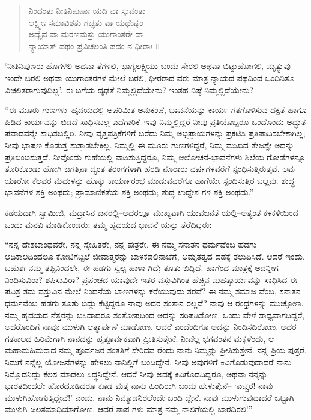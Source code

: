 \begin{verse}
ನಿಂದಂತು ನೀತಿನಿಪುಣಾಃ ಯದಿ ವಾ ಸ್ತುವಂತು\\ಲಕ್ಷ್ಮೀಃ ಸಮಾವಿಶತು ಗಚ್ಛತು ವಾ ಯಥೇಷ್ಟಂ\\ಅದ್ಯೈವ ವಾ ಮರಣಮಸ್ತು ಯುಗಾಂತರೇ ವಾ\\ನ್ಯಾಯಾತ್ ಪಥಂ ಪ್ರವಿಚಲಂತಿ ಪದಂ ನ ಧೀರಾಃ ॥
\end{verse}

‘ನೀತಿನಿಪುಣರು ಹೊಗಳಲಿ ಅಥವಾ ತೆಗಳಲಿ, ಭಾಗ್ಯಲಕ್ಷ್ಮಿಯು ಬಂದು ಸೇರಲಿ ಅಥವಾ ಬಿಟ್ಟುಹೋಗಲಿ, ಮೃತ್ಯುವು ಇಂದೇ ಬರಲಿ ಅಥವಾ ಯುಗಾಂತರಗಳ ಮೇಲೆ ಬರಲಿ, ಧೀರರಾದ ವರು ಮಾತ್ರ ನ್ಯಾಯದ ಪಥದಿಂದ ಒಂದಿನಿತೂ ವಿಚಲಿತರಾಗುವುದಿಲ್ಲ’. ಈ ಬಗೆಯ ದೃಢತೆ ನಿಮ್ಮಲ್ಲಿದೆಯೇನು? ಇಂತಹ ನಿಷ್ಠೆ ನಿಮ್ಮಲ್ಲಿದೆಯೇನು?

“ಈ ಮೂರು ಗುಣಗಳು–ಹೃದಯದಲ್ಲಿ ಅಪರಿಮಿತ ಅನುಕಂಪೆ, ಭಾವನೆಯನ್ನು ಕಾರ್ಯ ಗತಗೊಳಿಸುವ ದಕ್ಷತೆ ಹಾಗೂ ಹಿಡಿದ ಕಾರ್ಯವನ್ನು ಬಿಡದೆ ಸಾಧಿಸಬಲ್ಲ ಎದೆಗಾರಿಕೆ–ಇವು ನಿಮ್ಮಲ್ಲಿದ್ದರೆ ನೀವು ಪ್ರತಿಯೊಬ್ಬರೂ ಒಂದೊಂದು ಅದ್ಭುತ ಪವಾಡವನ್ನೇ ಸಾಧಿಸಬಲ್ಲಿರಿ. ನೀವು ವೃತ್ತಪತ್ರಿಕೆಗಳಿಗೆ ಬರೆದು ನಿಮ್ಮ ಅಭಿಪ್ರಾಯಗಳನ್ನು ಪ್ರಕಟಿಸಿ ಪ್ರತಿಪಾದಿಸಬೇಕಾಗಿಲ್ಲ; ನೀವು ಭಾಷಣ ಕೊಡುತ್ತ ಸುತ್ತಾಡಬೇಕಿಲ್ಲ. ನಿಮ್ಮಲ್ಲಿ ಈ ಮೂರು ಗುಣಗಳಿದ್ದರೆ, ನಿಮ್ಮ ಮುಖದ ತೇಜಸ್ಸೇ ಅದನ್ನು ಪ್ರತಿಬಿಂಬಿಸುತ್ತದೆ. ನೀವೊಂದು ಗುಹೆಯಲ್ಲಿ ವಾಸಿಸುತ್ತಿದ್ದರೂ, ನಿಮ್ಮ ಆಲೋಚನೆ-ಭಾವನೆಗಳು ಶಿಲೆಯ ಗೋಡೆಗಳನ್ನೂ ತೂರಿಕೊಂಡು ಹೋಗಿ ಜಗತ್ತಿನಾ ದ್ಯಂತ ತರಂಗಗಳಾಗಿ ಹರಡಿ ನೂರಾರು ವರ್ಷಗಳವರೆಗೆ ಸ್ಪಂಧಿಸುತ್ತಿರುತ್ತವೆ. ಅವು ಯಾರೋ ಕೆಲವರ ಮೆದುಳನ್ನು ಹೊಕ್ಕು ಕಾರ್ಯಾರಂಭ ಮಾಡುವವರೆಗೂ ಹಾಗೆಯೇ ಸ್ಪಂದಿಸುತ್ತಿರ ಬಲ್ಲವು. ಶುದ್ಧ ಭಾವನೆಗಳ ಶಕ್ತಿ ಅಂಥದು; ಪ್ರಾಮಾಣಿಕತೆಯ ಶಕ್ತಿ ಅಂಥದು; ಶುದ್ಧ ಉದ್ದೇಶ ಗಳ ಶಕ್ತಿ ಅಂಥದು.”

ಕಡೆಯದಾಗಿ ಸ್ವಾಮೀಜಿ, ಮದ್ರಾಸಿನ ಜನರಲ್ಲಿ–ಅದರಲ್ಲೂ ಮುಖ್ಯವಾಗಿ ಯುವಜನತೆ ಯಲ್ಲಿ–ಅತ್ಯಂತ ಕಳಕಳಿಯಿಂದ ಒಂದು ಮನವಿ ಮಾಡಿಕೊಂಡರು; ತಮ್ಮ ಹೃದಯದ ಭಾವನೆ ಯನ್ನು ತೆರೆದಿಟ್ಟರು:

“ನನ್ನ ದೇಶಬಾಂಧವರೇ, ನನ್ನ ಸ್ನೇಹಿತರೇ, ನನ್ನ ಪುತ್ರರೇ, ಈ ನಮ್ಮ ಸನಾತನ ಧರ್ಮವೆಂಬ ಹಡಗು ಆದಿಕಾಲದಿಂದಲೂ ಕೋಟಿಗಟ್ಟಲೆ ಜೀವಾತ್ಮರನ್ನು ಬಾಳಕಡಲಿನಾಚೆಗೆ, ಅಮೃತತ್ವದ ದಡಕ್ಕೆ ತಲುಪಿಸಿದೆ. ಆದರೆ ಇಂದು, ಬಹುಶಃ ನಮ್ಮ ತಪ್ಪಿನಿಂದಲೇ, ಈ ಹಡಗು ಸ್ವಲ್ಪ ಹಾಳಾ ಗಿದೆ; ತೂತು ಬಿದ್ದಿದೆ. ಹಾಗೆಂದ ಮಾತ್ರಕ್ಕೆ ಅದನ್ನೀಗ ನಿಂದಿಸುವಿರಾ? ಶಪಿಸುವಿರಾ? ಪ್ರಪಂಚದ ಯಾವುದೇ ಇತರ ವಸ್ತುವಿಗಿಂತ ಹೆಚ್ಚಿನ ಮಹತ್ಕಾರ್ಯವನ್ನು ಸಾಧಿಸಿದ ಈ ಪವಿತ್ರ ತಮ ವಸ್ತುವಿನ ಮೇಲೆ ನಿಂದನೆಯ ಬಾಣಗಳನ್ನು ಕರೆಯುವುದು ತರವೆ? ಈ ನಮ್ಮ ಸಮಾಜ ವೆಂಬ, ಸನಾತನ ಧರ್ಮವೆಂಬ ಹಡಗು ತೂತು ಬಿದ್ದು ಕೆಟ್ಟಿದ್ದರೂ ನಾವು ಅದರ ಸಂತಾನ ರಲ್ಲವೆ? ನಾವು ಆ ರಂಧ್ರಗಳನ್ನು ಮುಚ್ಚೋಣ. ನಮ್ಮ ಹೃದಯದ ನೆತ್ತರನ್ನು ಬಸಿದಾದರೂ ಸಂತೋಷದಿಂದ ಅದನ್ನು ಸರಿಪಡಿಸೋಣ. ಒಂದು ವೇಳೆ ಸಾಧ್ಯವಾಗದಿದ್ದರೆ, ಅದರೊಂದಿಗೆ ನಾವೂ ಮುಳುಗಿ ಆತ್ಮಾರ್ಪಣೆ ಮಾಡೋಣ. ಆದರೆ ಎಂದೆಂದಿಗೂ ಅದನ್ನು ನಿಂದಿಸದಿರೋಣ. ಅದರ ಗತಕಾಲದ ಹಿರಿಮೆಗಾಗಿ ನಾನದನ್ನು ಹೃತ್ಪೂರ್ವಕವಾಗಿ ಪ್ರೀತಿಸುತ್ತೇನೆ. ನೀವೆಲ್ಲ ಭಗವಂತನ ಮಕ್ಕಳೆಂದು, ಆ ಮಹಾಮಹಿಮರಾದ ನಮ್ಮ ಪೂರ್ವಜರ ಸಂತತಿಗೆ ಸೇರಿದವ ರೆಂದು ನಾನು ನಿಮ್ಮನ್ನು ಪ್ರೀತಿಸುತ್ತೇನೆ. ನನ್ನ ಪ್ರಿಯ ಪುತ್ರರೆ, ನಿಮಗೆ ನನ್ನೆಲ್ಲ ಯೋಜನೆಗಳನ್ನು ಹೇಳಲು ನಾನಿಲ್ಲಿಗೆ ಬಂದಿದ್ದೇನೆ. ನೀವು ಅವುಗಳಿಗೆ ಕಿವಿಗೊಡುವುದಾದರೆ ನಾನು ನಿಮ್ಮೊಡನಿದ್ದು ಕೆಲಸ ಮಾಡಲು ಸಿದ್ಧನಿದ್ದೇನೆ. ಆದರೆ ನೀವು ಅದಕ್ಕೆ ಕಿವಿಗೊಡದಿದ್ದರೂ, ಅಥವಾ ನನ್ನನ್ನು ಭಾರತದಿಂದಲೇ ಹೊರದೂಡಿದರೂ ಕೂಡ ಮತ್ತೆ ನಾನು ಹಿಂದಿರುಗಿ ಬಂದು ಹೇಳುತ್ತೇನೆ– ‘ಎಚ್ಚರ! ನಾವು ಮುಳುಗಿಹೋಗುತ್ತಿದ್ದೇವೆ!’ ಎಂದು. ನಾನು ನಿಮ್ಮೊಡನಿರಲೆಂದೇ ಬಂದಿ ದ್ದೇನೆ. ನಾವು ಮುಳುಗುವುದಾದರೆ ಒಟ್ಟಾಗಿ ಮುಳುಗಿ ಜಲಸಮಾಧಿಯಾಗೋಣ. ಆದರೆ ಶಾಪ ಗಳು ಮಾತ್ರ ನಮ್ಮ ನಾಲಿಗೆಯಲ್ಲಿ ಬಾರದಿರಲಿ!”


